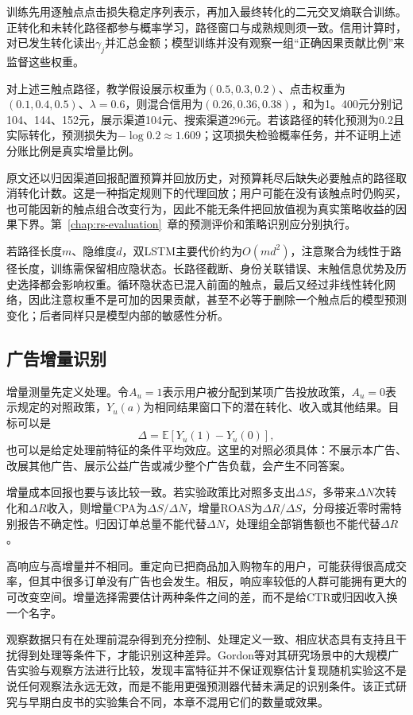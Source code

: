 训练先用逐触点点击损失稳定序列表示，再加入最终转化的二元交叉熵联合训练。正转化和未转化路径都参与概率学习，路径窗口与成熟规则须一致。信用计算时，对已发生转化读出$\gamma_j$并汇总金额；模型训练并没有观察一组“正确因果贡献比例”来监督这些权重。

对上述三触点路径，教学假设展示权重为$(0.5,0.3,0.2)$、点击权重为$(0.1,0.4,0.5)$、$\lambda=0.6$，则混合信用为$(0.26,0.36,0.38)$，和为1。400元分别记104、144、152元，展示渠道104元、搜索渠道296元。若该路径的转化预测为0.2且实际转化，预测损失为$-\log0.2\approx1.609$；这项损失检验概率任务，并不证明上述分账比例是真实增量比例。

原文还以归因渠道回报配置预算并回放历史，对预算耗尽后缺失必要触点的路径取消转化计数。这是一种指定规则下的代理回放；用户可能在没有该触点时仍购买，也可能因新的触点组合改变行为，因此不能无条件把回放值视为真实策略收益的因果下界。第~\ref{chap:rs-evaluation}~章的预测评价和策略识别应分别执行。

若路径长度$m$、隐维度$d$，双LSTM主要代价约为$O(md^2)$，注意聚合为线性于路径长度，训练需保留相应隐状态。长路径截断、身份关联错误、末触信息优势及历史选择都会影响权重。循环隐状态已混入前面的触点，最后又经过非线性转化网络，因此注意权重不是可加的因果贡献，甚至不必等于删除一个触点后的模型预测变化；后者同样只是模型内部的敏感性分析。

\subsection{广告增量识别}
\label{sec:rs-advertising-incrementality}

增量测量先定义处理。令$A_u=1$表示用户被分配到某项广告投放政策，$A_u=0$表示规定的对照政策，$Y_u(a)$为相同结果窗口下的潜在转化、收入或其他结果。目标可以是
\[
  \Delta=\mathbb E[Y_u(1)-Y_u(0)],
\]
也可以是给定处理前特征的条件平均效应。这里的对照必须具体：不展示本广告、改展其他广告、展示公益广告或减少整个广告负载，会产生不同答案。

增量成本回报也要与该比较一致。若实验政策比对照多支出$\Delta S$，多带来$\Delta N$次转化和$\Delta R$收入，则增量CPA为$\Delta S/\Delta N$，增量ROAS为$\Delta R/\Delta S$，分母接近零时需特别报告不确定性。归因订单总量不能代替$\Delta N$，处理组全部销售额也不能代替$\Delta R$。

高响应与高增量并不相同。重定向已把商品加入购物车的用户，可能获得很高成交率，但其中很多订单没有广告也会发生。相反，响应率较低的人群可能拥有更大的可改变空间。增量选择需要估计两种条件之间的差，而不是给CTR或归因收入换一个名字。

观察数据只有在处理前混杂得到充分控制、处理定义一致、相应状态具有支持且干扰得到处理等条件下，才能识别这种差异。Gordon等对其研究场景中的大规模广告实验与观察方法进行比较，发现丰富特征并不保证观察估计复现随机实验这不是说任何观察法永远无效，而是不能用更强预测器代替未满足的识别条件。该正式研究与早期白皮书的实验集合不同，本章不混用它们的数量或效果。

